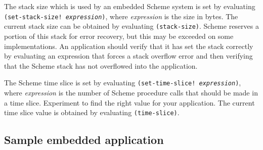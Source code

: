 \documentclass[12pt]{article}
\begin{document}
The stack size which is used by an embedded Scheme system is set by
evaluating \texttt{(set-stack-size!\ \textnormal{\emph{expression}})},
where \emph{expression} is the size in bytes.  The current stack size
can be obtained by evaluating \texttt{(stack-size)}.  Scheme reserves
a portion of this stack for error recovery, but this may be exceeded
on some implementations.  An application should verify that it has set
the stack correctly by evaluating an expression that forces a stack
overflow error and then verifying that the Scheme stack has not
overflowed into the application.

The Scheme time slice is set by evaluating
\texttt{(set-time-slice!\ \textnormal{\emph{expression}})}, where
\emph{expression} is the number of Scheme procedure calls that should
be made in a time slice.  Experiment to find the right value for your
application. The current time slice value is obtained by evaluating
\texttt{(time-slice)}.

\subsection*{Sample embedded application}
\end{document}
